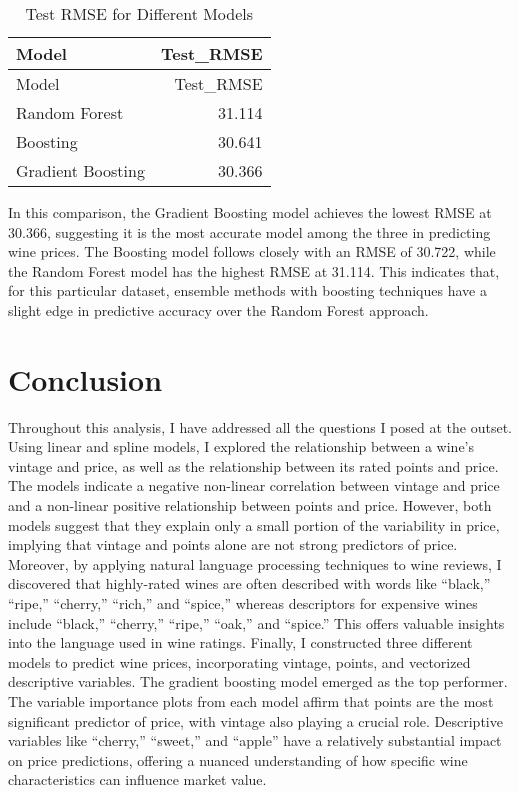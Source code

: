 \documentclass[
]{article}
\begin{document}
\begin{longtable}[]{@{}lr@{}}
\caption{Test RMSE for Different Models}\tabularnewline
\toprule()
Model & Test\_RMSE \\
\midrule()
\endfirsthead
\toprule()
Model & Test\_RMSE \\
\midrule()
\endhead
Random Forest & 31.114 \\
Boosting & 30.641 \\
Gradient Boosting & 30.366 \\
\bottomrule()
\end{longtable}

In this comparison, the Gradient Boosting model achieves the lowest RMSE
at 30.366, suggesting it is the most accurate model among the three in
predicting wine prices. The Boosting model follows closely with an RMSE
of 30.722, while the Random Forest model has the highest RMSE at 31.114.
This indicates that, for this particular dataset, ensemble methods with
boosting techniques have a slight edge in predictive accuracy over the
Random Forest approach.

\hypertarget{conclusion}{%
\section{Conclusion}\label{conclusion}}

Throughout this analysis, I have addressed all the questions I posed at
the outset. Using linear and spline models, I explored the relationship
between a wine's vintage and price, as well as the relationship between
its rated points and price. The models indicate a negative non-linear
correlation between vintage and price and a non-linear positive
relationship between points and price. However, both models suggest that
they explain only a small portion of the variability in price, implying
that vintage and points alone are not strong predictors of price.
Moreover, by applying natural language processing techniques to wine
reviews, I discovered that highly-rated wines are often described with
words like ``black,'' ``ripe,'' ``cherry,'' ``rich,'' and ``spice,''
whereas descriptors for expensive wines include ``black,'' ``cherry,''
``ripe,'' ``oak,'' and ``spice.'' This offers valuable insights into the
language used in wine ratings. Finally, I constructed three different
models to predict wine prices, incorporating vintage, points, and
vectorized descriptive variables. The gradient boosting model emerged as
the top performer. The variable importance plots from each model affirm
that points are the most significant predictor of price, with vintage
also playing a crucial role. Descriptive variables like ``cherry,''
``sweet,'' and ``apple'' have a relatively substantial impact on price
predictions, offering a nuanced understanding of how specific wine
characteristics can influence market value.
\end{document}
